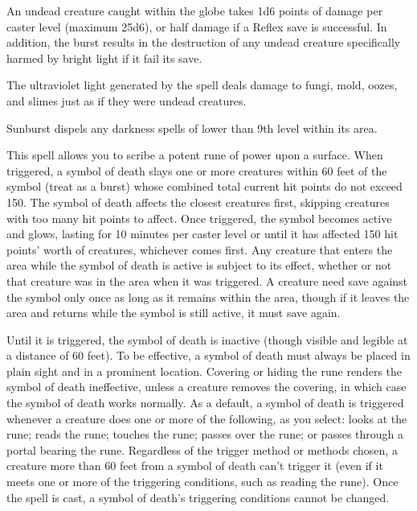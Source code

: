 \begin{multicols}{2}
\begin{small}
\smallskip\noindent An undead creature caught within the globe takes 1d6 points of damage per caster level (maximum 25d6), or half damage if a Reflex save is successful. In addition, the burst results in the destruction of any undead creature specifically harmed by bright light if it fail its save.

\smallskip\noindent The ultraviolet light generated by the spell deals damage to fungi, mold, oozes, and slimes just as if they were undead creatures.

\smallskip\noindent Sunburst dispels any darkness spells of lower than 9th level within its area.


\noindent This spell allows you to scribe a potent rune of power upon a surface. When triggered, a symbol of death slays one or more creatures within 60 feet of the symbol (treat as a burst) whose combined total current hit points do not exceed 150. The symbol of death affects the closest creatures first, skipping creatures with too many hit points to affect. Once triggered, the symbol becomes active and glows, lasting for 10 minutes per caster level or until it has affected 150 hit points' worth of creatures, whichever comes first. Any creature that enters the area while the symbol of death is active is subject to its effect, whether or not that creature was in the area when it was triggered. A creature need save against the symbol only once as long as it remains within the area, though if it leaves the area and returns while the symbol is still active, it must save again.

\smallskip\noindent Until it is triggered, the symbol of death is inactive (though visible and legible at a distance of 60 feet). To be effective, a symbol of death must always be placed in plain sight and in a prominent location. Covering or hiding the rune renders the symbol of death ineffective, unless a creature removes the covering, in which case the symbol of death works normally.
As a default, a symbol of death is triggered whenever a creature does one or more of the following, as you select: looks at the rune; reads the rune; touches the rune; passes over the rune; or passes through a portal bearing the rune. Regardless of the trigger method or methods chosen, a creature more than 60 feet from a symbol of death can't trigger it (even if it meets one or more of the triggering conditions, such as reading the rune). Once the spell is cast, a symbol of death's triggering conditions cannot be changed.


\end{small}
\end{multicols}
